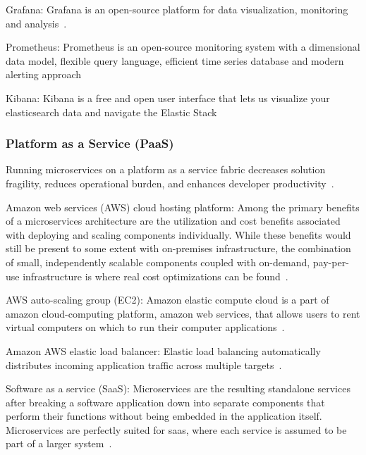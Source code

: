 \par Grafana: Grafana is an open-source platform for data visualization, monitoring and analysis~\cite{KalskeM2017,Kalske2017paper}. 

\par Prometheus: Prometheus is an open-source monitoring system with a dimensional data model, flexible query language, efficient time series database and modern alerting approach~\cite{KalskeM2017, Kalske2017paper} 

\par Kibana: Kibana is a free and open user interface that lets us visualize your elasticsearch data and navigate the Elastic Stack~\cite{KalskeM2017, Kalske2017paper} 


\subsubsection{Platform as a Service (PaaS)}

Running microservices on a platform as a service fabric decreases solution fragility, reduces operational burden, and enhances developer productivity~\cite{rosa2018, Mikail2020}.

\par Amazon web services (AWS) cloud hosting platform: Among the primary benefits of a microservices architecture are the utilization and cost benefits associated with deploying and scaling components individually. While these benefits would still be present to some extent with on-premises infrastructure, the combination of small, independently scalable components coupled with on-demand, pay-per-use infrastructure is where real cost optimizations can be found~\cite{McElhiney2018}.

\par AWS auto-scaling group (EC2): Amazon elastic compute cloud is a part of amazon cloud-computing platform, amazon web services, that allows users to rent virtual computers on which to run their computer applications~\cite{McElhiney2018}.

\par Amazon AWS elastic load balancer: Elastic load balancing automatically distributes incoming application traffic across multiple targets~\cite{McElhiney2018}.

\par Software as a service (SaaS): Microservices are the resulting standalone services after breaking a software application down into separate components that perform their functions without being embedded in the application itself. Microservices are perfectly suited for saas, where each service is assumed to be part of a larger system~\cite{haugeland2020}.

